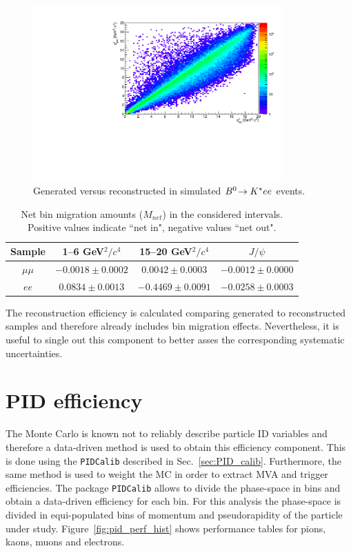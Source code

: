 \begin{figure}[h!]
\centering
\includegraphics[width=0.85\textwidth]{RKst/figs/bin_mig.pdf}
\caption{Generated versus reconstructed \qsq in simulated ${{B}^0}\!\rightarrow {\ensuremath{{K}^*}} ee$ events.}
\label{fig:ee_bin_mig}
\end{figure}

\begin{table}[bh]
\centering
\caption{Net bin migration amounts ($M_{net}$) in the considered \qsq intervals.
Positive values indicate ``net in", negative values ``net out".}
\begin{tabular}{|c|c|c|c|}
\hline
 Sample 			& 1--6 GeV$^2/c^4$ 				& 15--20 GeV$^2/c^4$ 				& $J/\psi$  \\ \hline
$\mu\mu$ 	& $ -0.0018  \pm  0.0002 $ & $ 0.0042  \pm  0.0003 $ & $ -0.0012  \pm  0.0000 $ \\
$ee$ 	& $ 0.0834  \pm  0.0013 $ & $ -0.4469  \pm  0.0091 $ & $ -0.0258  \pm  0.0003 $ \\
\hline 
 \end{tabular}
 \label{tab:bin_mig}
\end{table}

The reconstruction efficiency is calculated comparing generated to reconstructed samples
and therefore already includes bin migration effects. Nevertheless, it is useful to single
out this component to better asses the corresponding systematic uncertainties.



\section{PID efficiency}
\label{sec:RKst_pid_eff}

The Monte Carlo is known not to reliably describe particle ID variables
and therefore a data-driven method is used to obtain this efficiency component.
This is done using the \verb!PIDCalib! described in Sec.~\ref{sec:PID_calib}.
Furthermore, the same method is used to weight the MC in order to extract MVA
and trigger efficiencies.
The package \verb!PIDCalib!  allows to divide the phase-space in bins and obtain a data-driven
efficiency for each bin. For this analysis the phase-space is divided in equi-populated bins of momentum
and pseudorapidity of the particle under study. Figure~\ref{fig:pid_perf_hist} shows performance
tables for pions, kaons, muons and electrons.

